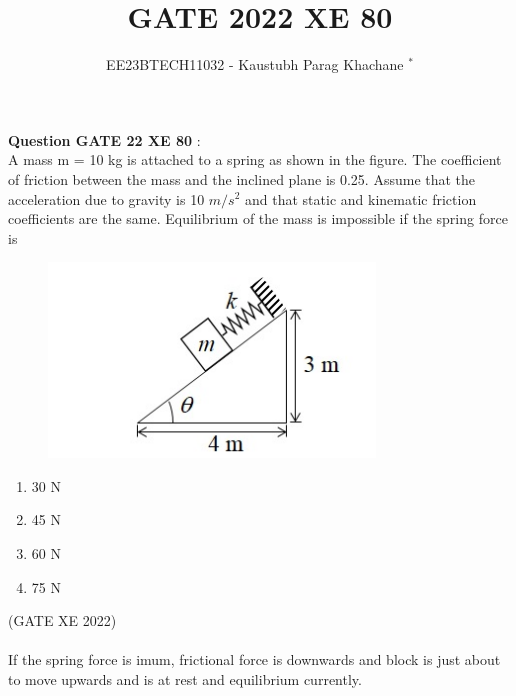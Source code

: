 \documentclass[journal,12pt,twocolumn]{IEEEtran}
\theoremstyle{remark}
\begin{document}

\vspace{3cm}

\Large\title{GATE 2022 XE 80}
\large\author{EE23BTECH11032 - Kaustubh Parag Khachane $^{*}$%
}
\maketitle
\newpage
\bigskip

\renewcommand{\thefigure}{\theenumi}
\renewcommand{\thetable}{\theenumi}
\large\textbf{Question GATE 22 XE 80} :\\
A mass m = 10 kg is attached to a spring as shown in the figure. The coefficient
of friction between the mass and the inclined plane is 0.25. Assume that the
acceleration due to gravity is 10 $m/s^2$ and that static and kinematic friction
coefficients are the same. Equilibrium of the mass is impossible if the spring
force is
\begin{figure}[!ht]
\centering
\begin{center}
\includegraphics[width=\columnwidth]{question}
\end{center}
\end{figure}
\begin{enumerate}
    \item 30 N
    \item 45 N
    \item 60 N
    \item 75 N
\end{enumerate}
\hfill(GATE XE 2022)\\
\solution\\

If the spring force is imum, frictional force is downwards and block is just about to move upwards and is at rest and equilibrium currently.\\
\end{document}
